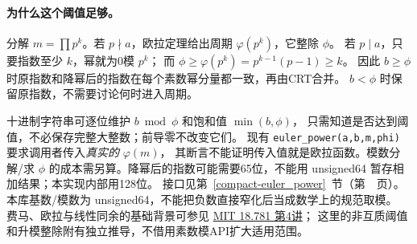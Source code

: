 \paragraph{为什么这个阈值足够。}
分解 $m=\prod p^k$。若 $p\nmid a$，欧拉定理给出周期 $\varphi(p^k)$，它整除 $\phi$。
若 $p\mid a$，只要指数至少 $k$，幂就为0模 $p^k$；
而 $\phi\ge\varphi(p^k)=p^{k-1}(p-1)\ge k$。
因此 $b\ge\phi$ 时原指数和降幂后的指数在每个素数幂分量都一致，再由CRT合并。
$b<\phi$ 时保留原指数，不需要讨论何时进入周期。

十进制字符串可逐位维护 $b\bmod\phi$ 和饱和值 $\min(b,\phi)$，
只需知道是否达到阈值，不必保存完整大整数；前导零不改变它们。
现有 \texttt{euler\_power(a,b,m,phi)} 要求调用者传入\emph{真实的} $\varphi(m)$，
其断言不能证明传入值就是欧拉函数。模数分解/求 $\phi$ 的成本需另算。降幂后的指数可能需要65位，不能用 unsigned64 暂存相加结果；本实现内部用128位。
接口见第~\ref{compact-euler_power}~节（第~\pageref{compact-euler_power}~页）。
本库基数/模数为 unsigned64，不能把负数直接窄化后当成数学上的规范取模。
费马、欧拉与线性同余的基础背景可参见
\href{https://ocw.mit.edu/courses/18-781-theory-of-numbers-spring-2012/resources/mit18_781s12_lec4/}{MIT 18.781 第4讲}；
这里的非互质阈值和升模整除附有独立推导，不借用素数模API扩大适用范围。
